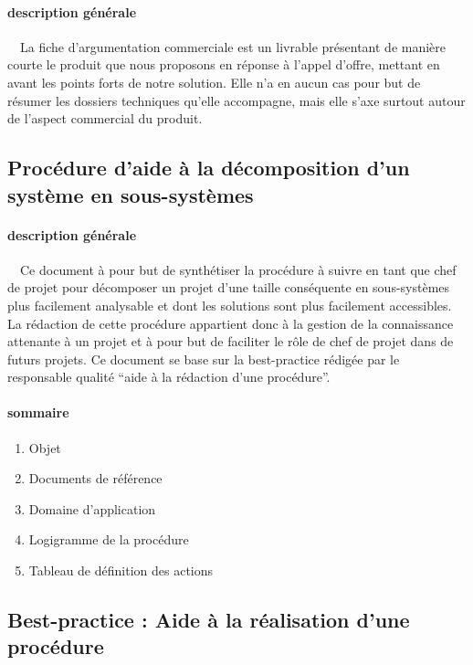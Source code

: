 \documentclass{mise_en_page}
\begin{document}
\paragraph[description générale]{description générale}
\ \ La fiche d’argumentation commerciale est un livrable présentant de
manière courte le produit que nous proposons en réponse à l’appel
d’offre, mettant en avant les points forts de notre solution. Elle n’a
en aucun cas pour but de résumer les dossiers techniques qu’elle
accompagne, mais elle s’axe surtout autour de l’aspect commercial du
produit.

\subsection[Procédure d’aide à la décomposition d’un système en
sous{}-systèmes]{Procédure d’aide à la décomposition d’un système en
sous-systèmes}
\paragraph[description générale]{description générale}
\ \ Ce document à pour but de synthétiser la procédure à suivre en tant
que chef de projet pour décomposer un projet d’une taille conséquente
en sous-systèmes plus facilement analysable et dont les solutions sont
plus facilement accessibles. La rédaction de cette procédure appartient
donc à la gestion de la connaissance attenante à un projet et à pour
but de faciliter le rôle de chef de projet dans de futurs projets. Ce
document se base sur la best-practice rédigée par le responsable
qualité “aide à la rédaction d’une procédure”.

\paragraph[sommaire]{sommaire}
\begin{enumerate}
\item Objet
\item Documents de référence
\item Domaine d’application
\item Logigramme de la procédure
\item Tableau de définition des actions
\end{enumerate}
\subsection[Best{}-practice : Aide à la réalisation d’une
procédure]{Best-practice : Aide à la réalisation d’une procédure}
\end{document}
